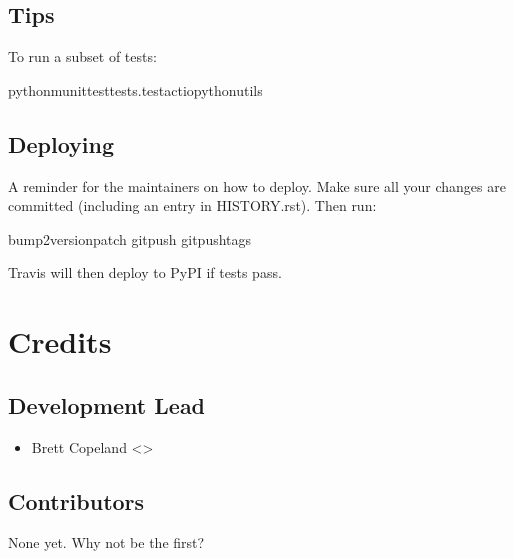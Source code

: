 \documentclass[letterpaper,10pt,english]{sphinxmanual}
\begin{document}
\section{Tips}
\label{\detokenize{contributing:tips}}
\sphinxAtStartPar
To run a subset of tests:

\begin{sphinxVerbatim}[commandchars=\\\{\}]
\PYGZdl{}python\PYGZhy{}munittesttests.test\PYGZus{}actio\PYGZus{}python\PYGZus{}utils
\end{sphinxVerbatim}


\section{Deploying}
\label{\detokenize{contributing:deploying}}
\sphinxAtStartPar
A reminder for the maintainers on how to deploy.
Make sure all your changes are committed (including an entry in HISTORY.rst).
Then run:

\begin{sphinxVerbatim}[commandchars=\\\{\}]
\PYGZdl{}bump2versionpatch
\PYGZdl{}gitpush
\PYGZdl{}gitpush\PYGZhy{}\PYGZhy{}tags
\end{sphinxVerbatim}

\sphinxAtStartPar
Travis will then deploy to PyPI if tests pass.

\sphinxstepscope


\chapter{Credits}
\label{\detokenize{authors:credits}}\label{\detokenize{authors::doc}}

\section{Development Lead}
\label{\detokenize{authors:development-lead}}\begin{itemize}
\item {} 
\sphinxAtStartPar
Brett Copeland \textless{}\textgreater{}

\end{itemize}


\section{Contributors}
\label{\detokenize{authors:contributors}}
\sphinxAtStartPar
None yet. Why not be the first?
\end{document}
